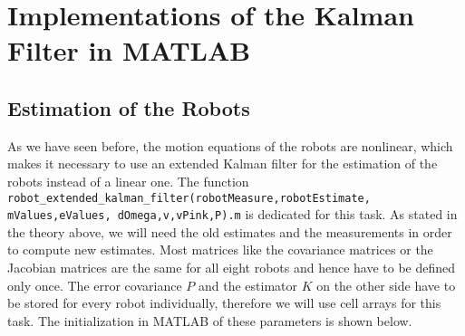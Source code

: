 
\chapter{Implementations of the Kalman Filter in MATLAB}

\section{Estimation of the Robots}

As we have seen before, the motion equations of the robots are nonlinear, which makes it necessary to use an extended Kalman filter for the estimation of the robots instead of a linear one. The function \texttt{robot\_extended\_kalman\_filter(robotMeasure,robotEstimate,} \texttt{mValues,eValues, dOmega,v,vPink,P).m} is dedicated for this task. As stated in the theory above, we will need the old estimates and the measurements in order to compute new estimates. Most matrices like the covariance matrices or the Jacobian matrices are the same for all eight robots and hence have to be defined only once. The error covariance \(P\) and the estimator \(K\) on the other side have to be stored for every robot individually, therefore we will use cell arrays for this task. The initialization in MATLAB of these parameters is shown below.


\parskip 20pt

